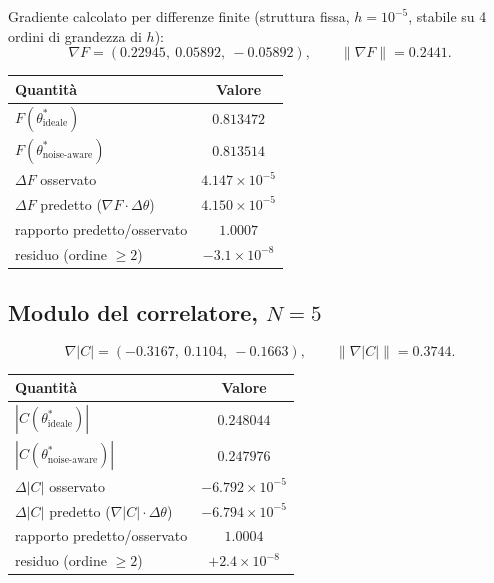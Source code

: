 \documentclass[11pt,a4paper]{article}
\begin{document}
Gradiente calcolato per differenze finite (struttura fissa, $h=10^{-5}$,
stabile su 4 ordini di grandezza di $h$):
\begin{equation}
\nabla F = (0.22945,\ 0.05892,\ -0.05892), \qquad \|\nabla F\| = 0.2441.
\end{equation}

\begin{center}
\renewcommand{\arraystretch}{1.3}
\begin{tabular}{@{}lc@{}}
\toprule
\textbf{Quantità} & \textbf{Valore}\\
\midrule
$F(\theta^*_\text{ideale})$ & $0.813472$\\
$F(\theta^*_\text{noise-aware})$ & $0.813514$\\
$\Delta F$ osservato & $4.147\times10^{-5}$\\
$\Delta F$ predetto ($\nabla F\cdot\Delta\theta$) & $4.150\times10^{-5}$\\
rapporto predetto/osservato & $1.0007$\\
residuo (ordine $\ge2$) & $-3.1\times10^{-8}$\\
\bottomrule
\end{tabular}
\end{center}

\subsection{Modulo del correlatore, $N=5$}

\begin{equation}
\nabla|C| = (-0.3167,\ 0.1104,\ -0.1663), \qquad \|\nabla|C|\| = 0.3744.
\end{equation}

\begin{center}
\renewcommand{\arraystretch}{1.3}
\begin{tabular}{@{}lc@{}}
\toprule
\textbf{Quantità} & \textbf{Valore}\\
\midrule
$|C(\theta^*_\text{ideale})|$ & $0.248044$\\
$|C(\theta^*_\text{noise-aware})|$ & $0.247976$\\
$\Delta|C|$ osservato & $-6.792\times10^{-5}$\\
$\Delta|C|$ predetto ($\nabla|C|\cdot\Delta\theta$) & $-6.794\times10^{-5}$\\
rapporto predetto/osservato & $1.0004$\\
residuo (ordine $\ge2$) & $+2.4\times10^{-8}$\\
\bottomrule
\end{tabular}
\end{center}
\end{document}
